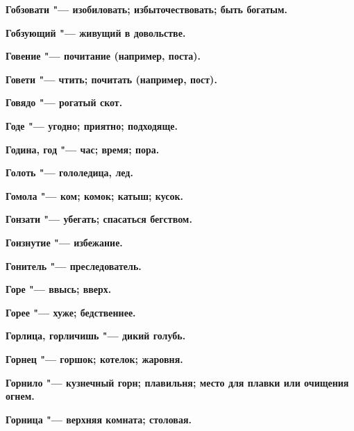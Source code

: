 \begin{mymulticols}{2}
\bfseries Гобзовати\normalfont{} "--- изобиловать; избыточествовать; быть богатым. 




\bfseries Гобзующий\normalfont{} "--- живущий в довольстве. 




\bfseries Говение\normalfont{} "--- почитание (например, поста). 




\bfseries Говети\normalfont{} "--- чтить; почитать (например, пост). 




\bfseries Говядо\normalfont{} "--- рогатый скот. 




\bfseries Годе\normalfont{} "--- угодно; приятно; подходяще. 




\bfseries Година, год\normalfont{} "--- час; время; пора. 




\bfseries Голоть\normalfont{} "--- гололедица, лед. 




\bfseries Гомола\normalfont{} "--- ком; комок; катыш; кусок. 




\bfseries Гонзати\normalfont{} "--- убегать; спасаться бегством. 




\bfseries Гонзнутие\normalfont{} "--- избежание. 




\bfseries Гонитель\normalfont{} "--- преследователь. 




\bfseries Горе\normalfont{} "--- ввысь; вверх. 




\bfseries Горее\normalfont{} "--- хуже; бедственнее. 




\bfseries Горлица, горличишь\normalfont{} "--- дикий голубь. 




\bfseries Горнец\normalfont{} "--- горшок; котелок; жаровня. 




\bfseries Горнило\normalfont{} "--- кузнечный горн; плавильня; место для плавки или очищения огнем. 




\bfseries Горница\normalfont{} "--- верхняя комната; столовая. 





\end{mymulticols}
